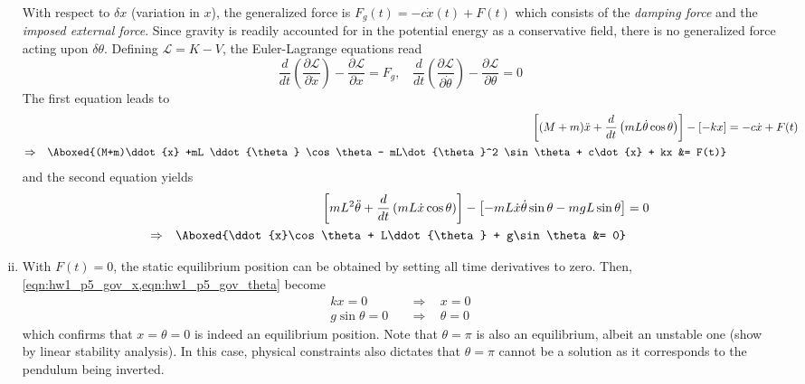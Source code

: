 \begin{enumerate}[(i)]
{    With respect to $\delta x$ (variation in $x$), the generalized force is $F_g(t) = -c \dot{x}(t) + F(t)$ which consists of the \emph{damping force} and the \emph{imposed external force}. 
    Since gravity is readily accounted for in the potential energy as a conservative field, there is no generalized force acting upon $\delta \theta$.
    Defining $\mathcal{L} = K - V$, the Euler-Lagrange equations read
    \begin{equation}
        \frac{d}{dt} \left( \frac{\partial \mathcal{L}}{\partial \dot{x}} \right) - \frac{\partial \mathcal{L}}{\partial x} = F_g, ~~~~ \frac{d}{dt} \left( \frac{\partial \mathcal{L}}{\partial \dot{\theta}} \right) - \frac{\partial \mathcal{L}}{\partial \theta} = 0
    \end{equation}
    The first equation leads to
    \begin{equation}\label{eqn:hw1_p5_gov_x}
    \begin{aligned}
        &&\left[(M+m)\ddot{x} + \frac{d}{dt}\left(mL\dot{\theta} \cos\theta\right)\right] - \left[-kx\right] &= -c\dot{x} + F(t) \\
        \Rightarrow && \Aboxed{(M+m)\ddot{x} +mL \ddot{\theta} \cos\theta - mL\dot{\theta}^2 \sin\theta + c\dot{x} + kx &= F(t)}
    \end{aligned}
    \end{equation}
    and the second equation yields 
    \begin{equation}\label{eqn:hw1_p5_gov_theta}
    \begin{aligned}
        && \left[mL^2 \ddot{\theta} + \frac{d}{dt}\left(mL\dot{x} \cos\theta\right)\right] - \left[-mL \dot{x} \dot{\theta} \sin\theta - mgL\sin\theta \right] &= 0 \\
        \Rightarrow && \Aboxed{\ddot{x}\cos\theta + L\ddot{\theta} + g\sin\theta &= 0}
    \end{aligned}
    \end{equation}
}
\item { %
    With $F(t) = 0$, the static equilibrium position can be obtained by setting all time derivatives to zero. 
    Then, \cref{eqn:hw1_p5_gov_x,eqn:hw1_p5_gov_theta} become
    \begin{equation}
    \begin{aligned}
        kx = 0 & ~~~~\Rightarrow ~~~~x = 0 \\
        g\sin\theta = 0 & ~~~~\Rightarrow ~~~~\theta = 0
    \end{aligned}
    \end{equation}
    which confirms that $x = \theta = 0$ is indeed an equilibrium position. 
    Note that $\theta = \pi$ is also an equilibrium, albeit an unstable one (show by linear stability analysis). 
    In this case, physical constraints also dictates that $\theta = \pi$ cannot be a solution as it corresponds to the pendulum being inverted. 

}
\end{enumerate}
